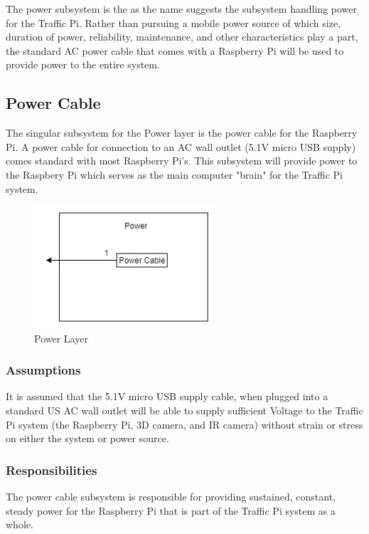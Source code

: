 The power subsystem is the as the name suggests the subsystem handling power for the Traffic Pi. Rather than pursuing a mobile power source of which size, duration of power, reliability, maintenance, and other characteristics play a part, the standard AC power cable that comes with a Raspberry Pi will be used to provide power to the entire system. 

\subsection{Power Cable}
The singular subsystem for the Power layer is the power cable for the Raspberry Pi. A power cable for connection to an AC wall outlet (5.1V micro USB supply) comes standard with most Raspberry Pi's. This subsystem will provide power to the Raspbery Pi which serves as the main computer "brain" for the Traffic Pi system.

\begin{figure}[h!]
	\centering
 	\includegraphics[width=0.60\textwidth]{images/power_layer}
 \caption{Power Layer}
\end{figure}

\subsubsection{Assumptions}
It is assumed that the 5.1V micro USB supply cable, when plugged into a standard US AC wall outlet will be able to supply sufficient Voltage to the Traffic Pi system (the Raspberry Pi, 3D camera, and IR camera) without strain or stress on either the system or power source.

\subsubsection{Responsibilities}
The power cable subsystem is responsible for providing sustained, constant, steady power for the Raspberry Pi that is part of the Traffic Pi system as a whole. 

